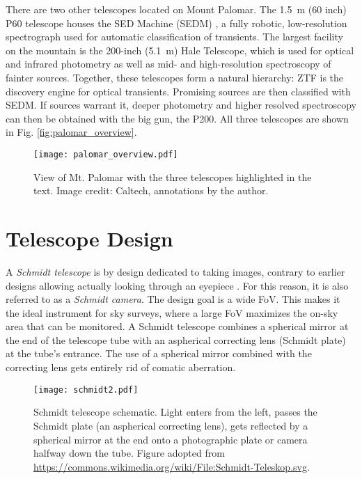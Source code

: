 There are two other telescopes located on Mount Palomar. The \SI{1.5}{\meter} (60 inch) P60 telescope houses the SED Machine (SEDM) , a fully robotic, low-resolution spectrograph used for automatic classification of transients. The largest facility on the mountain is the 200-inch (\SI{5.1}{\meter}) Hale Telescope, which is used for optical and infrared photometry as well as mid- and high-resolution spectroscopy of fainter sources. Together, these telescopes form a natural hierarchy: ZTF is the discovery engine for optical transients. Promising sources are then classified with SEDM. If sources warrant it, deeper photometry and higher resolved spectroscopy can then be obtained with the big gun, the P200. All three telescopes are shown in Fig. \ref{fig:palomar_overview}.

\begin{figure*}[]
    \texttt{[image: palomar\_overview.pdf]}
    \caption[View of Mt. Palomar]{View of Mt. Palomar with the three telescopes highlighted in the text. Image credit: Caltech, annotations by the author.}
\end{figure*}

\section{Telescope Design}
A \textit{Schmidt telescope} is by design dedicated to taking images, contrary to earlier designs allowing actually looking through an eyepiece . For this reason, it is also referred to as a \textit{Schmidt camera}. The design goal is a wide FoV. This makes it the ideal instrument for sky surveys, where a large FoV maximizes the on-sky area that can be monitored. A Schmidt telescope combines a spherical mirror at the end of the telescope tube with an aspherical correcting lens (Schmidt plate) at the tube's entrance. The use of a spherical mirror combined with the correcting lens gets entirely rid of comatic aberration.

\begin{figure}[]
    \texttt{[image: schmidt2.pdf]}
    \caption[Schmidt telescope schematic]{Schmidt telescope schematic. Light enters from the left, passes the Schmidt plate (an aspherical correcting lens), gets reflected by a spherical mirror at the end onto a photographic plate or camera halfway down the tube. Figure adopted from \url{https://commons.wikimedia.org/wiki/File:Schmidt-Teleskop.svg}.}
\end{figure}

